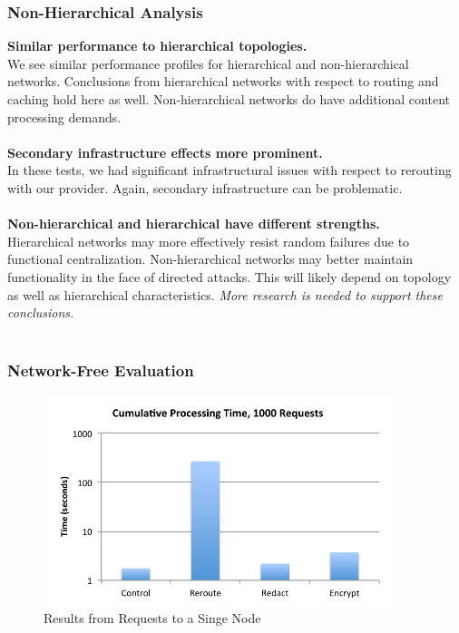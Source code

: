 \documentclass[t,handout]{beamer}
\begin{document}
\begin{frame}
\frametitle{Non-Hierarchical Analysis}
{\bf Similar performance to hierarchical topologies.} \\
{\scriptsize We see similar performance profiles for hierarchical and non-hierarchical networks.  Conclusions from hierarchical networks with respect to routing and caching hold here as well. Non-hierarchical networks do have additional content processing demands.} \\
~\\
{\bf Secondary infrastructure effects more prominent.} \\
{\scriptsize In these tests, we had significant infrastructural issues with respect to rerouting with our provider.  Again, secondary infrastructure can be problematic.  } \\
~\\
{\bf Non-hierarchical and hierarchical have different strengths.} \\
{\scriptsize Hierarchical networks may more effectively resist random failures due to functional centralization. Non-hierarchical networks may better maintain functionality in the face of directed attacks.  This will likely depend on topology as well as hierarchical characteristics.  \textit{More research is needed to support these conclusions.}} \\
~\\
\end{frame}

\begin{frame}
\frametitle{Network-Free Evaluation}
\begin{figure}[!t]
\centering
\includegraphics[width=4in]{single-node-results}
\caption{Results from Requests to a Singe Node}
\end{figure}
\end{frame}
\end{document}
